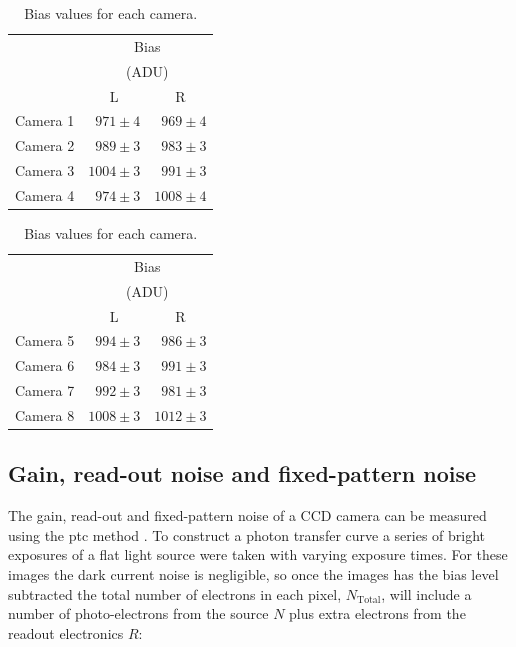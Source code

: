 \begin{colsection}
\begin{colsection}
\begin{table}[t]
    \begin{center}
        \begin{tabular}{c|rr} %
             & \multicolumn{2}{c}{Bias} \\
             & \multicolumn{2}{c}{(ADU)} \\
             & \multicolumn{1}{c}{L} & \multicolumn{1}{c}{R} \\
            \midrule
            Camera 1 & $971\pm4$ & $969\pm4$ \\
            Camera 2 & $989\pm3$ & $983\pm3$ \\
            Camera 3 & $1004\pm3$ & $991\pm3$ \\
            Camera 4 & $974\pm3$ & $1008\pm4$ \\
        \end{tabular}
        \hspace{0.5cm}
        \begin{tabular}{c|rr} %
             & \multicolumn{2}{c}{Bias} \\
             & \multicolumn{2}{c}{(ADU)} \\
             & \multicolumn{1}{c}{L} & \multicolumn{1}{c}{R} \\
            \midrule
            Camera 5 & $994\pm3$ & $986\pm3$ \\
            Camera 6 & $984\pm3$ & $991\pm3$ \\
            Camera 7 & $992\pm3$ & $981\pm3$ \\
            Camera 8 & $1008\pm3$ & $1012\pm3$ \\
        \end{tabular}
    \end{center}
    \caption[Bias values]{
        Bias values for each camera.
    }\label{tab:bias}
\end{table}

\end{colsection}

\newpage
\subsection{Gain, read-out noise and fixed-pattern noise}
\label{sec:ptc}
\begin{colsection}

The gain, read-out and fixed-pattern noise of a CCD camera can be measured using the \gls{ptc} method \citep{CCDs, PTC}. To construct a photon transfer curve a series of bright exposures of a flat light source were taken with varying exposure times. For these images the dark current noise is negligible, so once the images has the bias level subtracted the total number of electrons in each pixel, $N_\text{Total}$, will include a number of photo-electrons from the source $N$ plus extra electrons from the readout electronics $R$:


\end{colsection}
\end{colsection}
